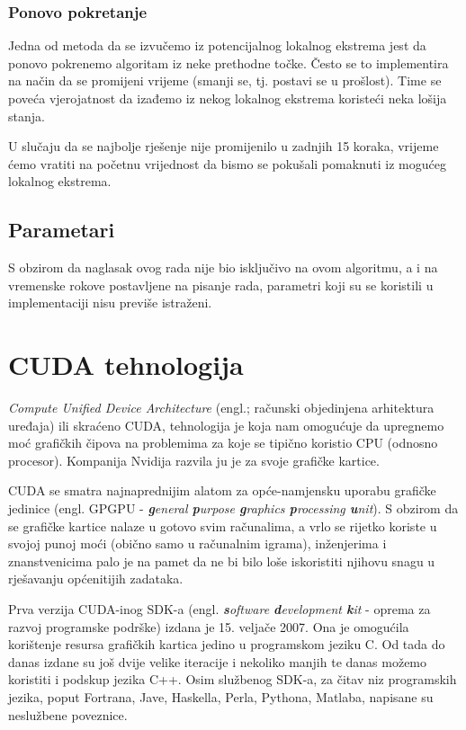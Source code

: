 \documentclass[times, utf8, zavrsni]{fer}
\begin{document}
\subsection{Ponovo pokretanje}

Jedna od metoda da se izvučemo iz potencijalnog lokalnog ekstrema jest da
ponovo pokrenemo algoritam iz neke prethodne točke. Često se to implementira
na način da se promijeni vrijeme (smanji se, tj. postavi se u prošlost).
Time se poveća vjerojatnost da izađemo iz nekog lokalnog ekstrema koristeći
neka lošija stanja. 

U slučaju da se najbolje rješenje nije promijenilo u zadnjih 15 koraka, 
vrijeme ćemo vratiti na početnu vrijednost da bismo se pokušali
pomaknuti iz mogućeg lokalnog ekstrema. 

\section{Parametari}

S obzirom da naglasak ovog rada nije bio isključivo na ovom algoritmu, 
a i na vremenske rokove postavljene na pisanje rada, parametri koji su se
koristili u implementaciji nisu previše istraženi. 






\chapter{CUDA tehnologija}
\label{chapter:CUDA}
\textit{Compute Unified Device Architecture} (engl.; računski objedinjena
arhitektura uređaja) ili skraćeno CUDA, tehnologija je
koja nam omogućuje da upregnemo moć grafičkih čipova na
problemima za koje se tipično koristio CPU (odnosno procesor).
Kompanija Nvidija razvila ju je za svoje grafičke kartice. 

CUDA se smatra najnaprednijim alatom za opće-namjensku uporabu
grafičke jedinice (engl. GPGPU - \textit{\textbf{g}eneral
\textbf{p}urpose \textbf{g}raphics \textbf{p}rocessing \textbf{u}nit}).
S obzirom da se grafičke kartice nalaze u gotovo svim
računalima, a vrlo se rijetko koriste u svojoj punoj moći
(obično samo u računalnim igrama), inženjerima i znanstvenicima
palo je na pamet da ne bi bilo loše iskoristiti njihovu snagu
u rješavanju općenitijih zadataka. 

Prva verzija CUDA-inog SDK-a (engl. \textit{\textbf{s}oftware
\textbf{d}evelopment \textbf{k}it} - oprema za razvoj programske
podrške) izdana je 15. veljače 2007.
Ona je omogućila korištenje resursa grafičkih kartica jedino u
programskom jeziku C. Od tada do danas izdane su još dvije velike
iteracije i nekoliko manjih te danas možemo koristiti i podskup
jezika C++. Osim službenog SDK-a, za čitav niz programskih jezika,
poput Fortrana, Jave, Haskella, Perla, Pythona, Matlaba, napisane su
neslužbene poveznice. 
\end{document}
